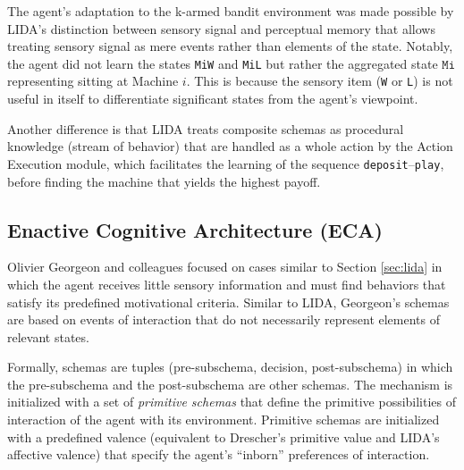 \documentclass[runningheads]{llncs}
\begin{document}
The agent's adaptation to the k-armed bandit environment was made possible by LIDA's distinction between sensory signal and perceptual memory that allows treating sensory signal as mere events rather than elements of the state. 
Notably, the agent did not learn the states \texttt{MiW} and \texttt{MiL} but rather the aggregated state $\texttt{Mi}$ representing sitting at Machine $i$.
This is because the sensory item (\texttt{W} or \texttt{L}) is not useful in itself to differentiate significant states from the agent's viewpoint. 

Another difference is that LIDA treats composite schemas as procedural knowledge (stream of behavior) that are handled as a whole action by the Action Execution module, which facilitates the learning of the sequence \texttt{deposit}--\texttt{play}, before finding the machine that yields the highest payoff. 


\subsection{Enactive Cognitive Architecture (ECA)}

Olivier Georgeon and colleagues focused on cases similar to Section \ref{sec:lida} in which the agent receives little sensory information and must find behaviors that satisfy its predefined motivational criteria. 
Similar to LIDA, Georgeon's schemas are based on events of interaction that do not necessarily represent elements of relevant states.  

Formally, schemas are tuples (pre-subschema, decision, post-subschema) in which the pre-subschema and the post-subschema are other schemas.  
The mechanism is initialized with a set of \textit{primitive schemas} that define the primitive possibilities of interaction of the agent with its environment. 
Primitive schemas are initialized with a predefined valence (equivalent to Drescher's primitive value and LIDA's affective valence) that specify the agent's ``inborn'' preferences of interaction. 
\end{document}
